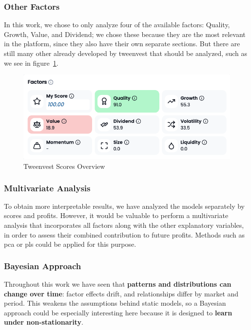\documentclass[11pt,english,a4paper,hidelinks]{book}
\begin{document}
\subsubsection{Other Factors}

\noindent In this work, we chose to only analyze four of the available factors: Quality, Growth, Value, and Dividend; we chose these because they are the most relevant in the platform, since they also have their own separate sections. But there are still many other already developed by tweenvest that should be analyzed, such as we see in figure~\ref{fig:factor_scores_overview}.

\begin{figure}[H]
    \centering
    \includegraphics[width=1\textwidth]{images/tweenvest/All of the scores.png}
    \caption{Tweenvest Scores Overview}
    \label{fig:factor_scores_overview}
\end{figure}

\subsubsection{Multivariate Analysis}

\noindent To obtain more interpretable results, we have analyzed the models separately by scores and profits. However, it would be valuable to perform a multivariate analysis that incorporates all factors along with the other explanatory variables, in order to assess their combined contribution to future profits. Methods such as \gls{pca} or \gls{pls} could be applied for this purpose.

\subsubsection{Bayesian Approach}

\noindent Throughout this work we have seen that \textbf{patterns and distributions can change over time}: factor effects drift, and relationships differ by market and period. This weakens the assumptions behind static models, so a Bayesian approach could be especially interesting here because it is designed to \textbf{learn under non-stationarity}.
\end{document}
